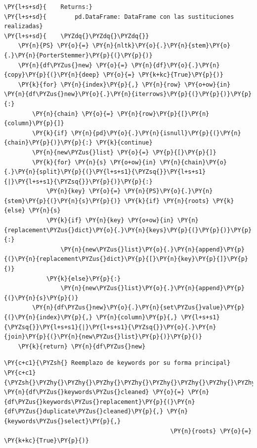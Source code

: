 \begin{tcolorbox}[breakable, size=fbox, boxrule=1pt, pad at break*=1mm,colback=cellbackground, colframe=cellborder]
\begin{Verbatim}[commandchars=\\\{\}]
\PY{l+s+sd}{    Returns:}
\PY{l+s+sd}{        pd.DataFrame: DataFrame con las sustituciones realizadas}
\PY{l+s+sd}{    \PYZdq{}\PYZdq{}\PYZdq{}}
    \PY{n}{PS} \PY{o}{=} \PY{n}{nltk}\PY{o}{.}\PY{n}{stem}\PY{o}{.}\PY{n}{PorterStemmer}\PY{p}{(}\PY{p}{)}
    \PY{n}{df\PYZus{}new} \PY{o}{=} \PY{n}{df}\PY{o}{.}\PY{n}{copy}\PY{p}{(}\PY{n}{deep} \PY{o}{=} \PY{k+kc}{True}\PY{p}{)}
    \PY{k}{for} \PY{n}{index}\PY{p}{,} \PY{n}{row} \PY{o+ow}{in} \PY{n}{df\PYZus{}new}\PY{o}{.}\PY{n}{iterrows}\PY{p}{(}\PY{p}{)}\PY{p}{:}
        \PY{n}{chain} \PY{o}{=} \PY{n}{row}\PY{p}{[}\PY{n}{column}\PY{p}{]}
        \PY{k}{if} \PY{n}{pd}\PY{o}{.}\PY{n}{isnull}\PY{p}{(}\PY{n}{chain}\PY{p}{)}\PY{p}{:} \PY{k}{continue}
        \PY{n}{new\PYZus{}list} \PY{o}{=} \PY{p}{[}\PY{p}{]}
        \PY{k}{for} \PY{n}{s} \PY{o+ow}{in} \PY{n}{chain}\PY{o}{.}\PY{n}{split}\PY{p}{(}\PY{l+s+s1}{\PYZsq{}}\PY{l+s+s1}{|}\PY{l+s+s1}{\PYZsq{}}\PY{p}{)}\PY{p}{:} 
            \PY{n}{key} \PY{o}{=} \PY{n}{PS}\PY{o}{.}\PY{n}{stem}\PY{p}{(}\PY{n}{s}\PY{p}{)} \PY{k}{if} \PY{n}{roots} \PY{k}{else} \PY{n}{s}
            \PY{k}{if} \PY{n}{key} \PY{o+ow}{in} \PY{n}{replacement\PYZus{}dict}\PY{o}{.}\PY{n}{keys}\PY{p}{(}\PY{p}{)}\PY{p}{:}
                \PY{n}{new\PYZus{}list}\PY{o}{.}\PY{n}{append}\PY{p}{(}\PY{n}{replacement\PYZus{}dict}\PY{p}{[}\PY{n}{key}\PY{p}{]}\PY{p}{)}
            \PY{k}{else}\PY{p}{:}
                \PY{n}{new\PYZus{}list}\PY{o}{.}\PY{n}{append}\PY{p}{(}\PY{n}{s}\PY{p}{)}       
        \PY{n}{df\PYZus{}new}\PY{o}{.}\PY{n}{set\PYZus{}value}\PY{p}{(}\PY{n}{index}\PY{p}{,} \PY{n}{column}\PY{p}{,} \PY{l+s+s1}{\PYZsq{}}\PY{l+s+s1}{|}\PY{l+s+s1}{\PYZsq{}}\PY{o}{.}\PY{n}{join}\PY{p}{(}\PY{n}{new\PYZus{}list}\PY{p}{)}\PY{p}{)} 
    \PY{k}{return} \PY{n}{df\PYZus{}new}
\end{Verbatim}
\end{tcolorbox}

    \begin{tcolorbox}[breakable, size=fbox, boxrule=1pt, pad at break*=1mm,colback=cellbackground, colframe=cellborder]
\begin{Verbatim}[commandchars=\\\{\}]
\PY{c+c1}{\PYZsh{} Reemplazo de keywords por su forma principal}
\PY{c+c1}{\PYZsh{}\PYZhy{}\PYZhy{}\PYZhy{}\PYZhy{}\PYZhy{}\PYZhy{}\PYZhy{}\PYZhy{}\PYZhy{}\PYZhy{}\PYZhy{}\PYZhy{}\PYZhy{}\PYZhy{}\PYZhy{}\PYZhy{}\PYZhy{}\PYZhy{}\PYZhy{}\PYZhy{}\PYZhy{}\PYZhy{}\PYZhy{}\PYZhy{}\PYZhy{}\PYZhy{}\PYZhy{}\PYZhy{}\PYZhy{}\PYZhy{}\PYZhy{}\PYZhy{}\PYZhy{}\PYZhy{}\PYZhy{}\PYZhy{}\PYZhy{}\PYZhy{}\PYZhy{}\PYZhy{}\PYZhy{}\PYZhy{}\PYZhy{}\PYZhy{}\PYZhy{}\PYZhy{}\PYZhy{}\PYZhy{}\PYZhy{}}
\PY{n}{df\PYZus{}keywords\PYZus{}cleaned} \PY{o}{=} \PY{n}{df\PYZus{}keywords\PYZus{}replacement}\PY{p}{(}\PY{n}{df\PYZus{}duplicate\PYZus{}cleaned}\PY{p}{,} \PY{n}{keywords\PYZus{}select}\PY{p}{,}
                                               \PY{n}{roots} \PY{o}{=} \PY{k+kc}{True}\PY{p}{)}
\end{Verbatim}
\end{tcolorbox}

